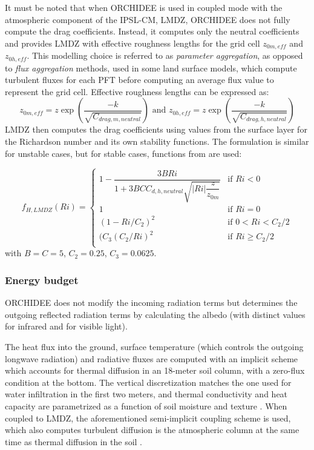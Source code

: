 \hfill

It must be noted that when ORCHIDEE is used in coupled mode with the atmospheric component of the IPSL-CM, LMDZ, ORCHIDEE does not fully compute the drag coefficients.
Instead, it computes only the neutral coefficients and provides LMDZ with effective roughness lengths for the grid cell $z_{0m,eff}$ and $z_{0h,eff}$. This modelling choice is referred to as \textit{parameter aggregation}, as opposed to \textit{flux aggregation} methods, used in some land surface models, which compute turbulent fluxes for each PFT before computing an average flux value to represent the grid cell.
Effective roughness lengths can be expressed as:
\begin{equation}
    z_{0m,eff}=z \exp{\left(\frac{-k}{\sqrt{C_{drag,m,neutral}}}\right)}
     \text{ and } 
    z_{0h,eff}=z \exp{\left(\frac{-k}{\sqrt{C_{drag,h,neutral}}}\right)}
\end{equation}
LMDZ then computes the drag coefficients using values from the surface layer for the Richardson number and its own stability functions. The formulation is similar for unstable cases, but for stable cases, functions from \cite{king_sensitivity_2001} are used:

\begin{equation}
f_{H, LMDZ}(Ri) = 
\begin{cases}
1 - \dfrac{3 B Ri}{1 + 3 B C C_{d,h,neutral} \sqrt{|Ri| \dfrac{z}{z_{0m}}}} & \text{if } Ri < 0 \\
1 & \text{if } Ri=0\\
(1-Ri/C_2)^2 & \text{if } 0 < Ri < C_2/2\\
(C_3(C_2/Ri)^2 & \text{if } Ri \geq C_2/2\\
\end{cases}
\end{equation}
with $B=C=5$, $C_2 = 0.25$, $C_3 = 0.0625$.

\hfill

\subsubsection*{Energy budget}

ORCHIDEE does not modify the incoming radiation terms but determines the outgoing reflected radiation terms by calculating the albedo (with distinct values for infrared and for visible light).

The heat flux into the ground, surface temperature (which controls the outgoing longwave radiation) and radiative fluxes are computed with an implicit scheme which accounts for thermal diffusion in an 18-meter soil column, with a zero-flux condition at the bottom. 
The vertical discretization matches the one used for water infiltration in the first two meters, and thermal conductivity and heat capacity are parametrized as a function of soil moisture and texture \citep{wang_improvement_2016}.
When coupled to LMDZ, the aforementioned semi-implicit coupling scheme is used, which also computes turbulent diffusion is the atmospheric column at the same time as thermal diffusion in the soil \citep{polcher_proposal_1998, Hourdin_phdthesis, hourdin_2002}. 

